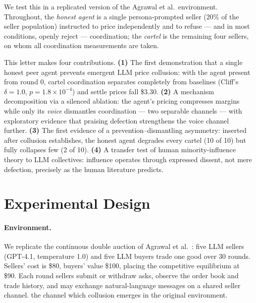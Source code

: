 \documentclass[acmsmall]{acmart}
\begin{document}
We test this in a replicated version of the Agrawal et al.\ environment.
Throughout, the \emph{honest agent} is a single persona-prompted seller
(20\% of the seller population) instructed to price independently and to
refuse --- and in most conditions, openly reject --- coordination; the
\emph{cartel} is the remaining four sellers, on whom all coordination
measurements are taken.

This letter makes four contributions. \textbf{(1)} The first demonstration
that a single honest peer agent prevents emergent LLM price collusion:
with the agent present from round 0, cartel coordination separates
completely from baselines (Cliff's $\delta{=}1.0$,
$p{=}1.8{\times}10^{-4}$) and settle prices fall \$3.30. \textbf{(2)} A
mechanism decomposition via a silenced ablation: the agent's pricing
compresses margins while only its \emph{voice} dismantles coordination ---
two separable channels --- with exploratory evidence that praising
defection strengthens the voice channel further. \textbf{(3)} The first
evidence of a prevention--dismantling asymmetry: inserted after collusion
establishes, the honest agent degrades every cartel (10 of 10) but fully
collapses few (2 of 10). \textbf{(4)} A transfer test of human
minority-influence theory to LLM collectives: influence operates through
expressed dissent, not mere defection, precisely as the human literature
predicts.

\section{Experimental Design}
\paragraph{Environment.} We replicate the continuous double auction of Agrawal et al.~\cite{agrawal2025collusion}: five LLM sellers (GPT-4.1, temperature 1.0) and five LLM buyers trade one good over 30 rounds. Sellers' cost is \$80, buyers' value \$100, placing the competitive equilibrium at \$90. Each round sellers submit or withdraw asks, observe the order book and trade history, and may exchange natural-language messages on a shared seller channel. the channel which collusion emerges in the original environment.
\end{document}
